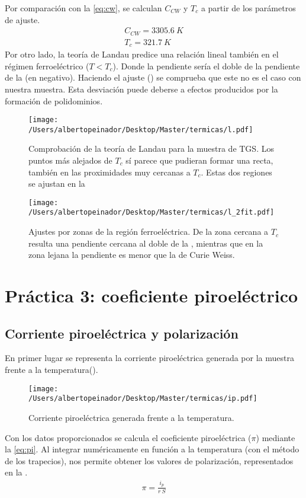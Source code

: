 \documentclass[a4paper, 12pt, spanish]{article}
\begin{document}
\begin{multicols}{2}
Por comparación con la \cref{eq:cw}, se calculan $C_{CW}$ y $T_c$ a partir de los parámetros de ajuste.\begin{eqnarray}
    C_{CW} = 3305.6\ K\\
    T_c = 321.7\ K
\end{eqnarray}
Por otro lado, la teoría de Landau predice una relación lineal también en el régimen ferroeléctrico ($T<T_c$). Donde la pendiente sería el doble de la pendiente de la  (en negativo). Haciendo el ajuste () se comprueba que este no es el caso con nuestra muestra. Esta desviación puede deberse a efectos producidos por la formación de polidominios.
\begin{figure}[H]
    \centering
    \texttt{[image: /Users/albertopeinador/Desktop/Master/termicas/l.pdf]}
    \caption{Comprobación de la teoría de Landau para la muestra de TGS. Los puntos más alejados de $T_c$ sí parece que pudieran formar una recta, también en las proximidades muy cercanas a $T_c$. Estas dos regiones se ajustan en la }\label{fig:l}
\end{figure}
\begin{figure}[H]
    \centering
    \texttt{[image: /Users/albertopeinador/Desktop/Master/termicas/l\_2fit.pdf]}
    \caption{Ajustes por zonas de la región ferroeléctrica. De la zona cercana a $T_c$ resulta una pendiente cercana al doble de la , mientras que en la zona lejana la pendiente es menor que la de Curie Weiss.}\label{fig:l_2}
\end{figure}

\section{Práctica 3: coeficiente piroeléctrico}
\subsection*{Corriente piroeléctrica y polarización}
En primer lugar se representa la corriente piroeléctrica generada por la muestra frente a la temperatura().
\begin{figure}[H]
    \centering
    \texttt{[image: /Users/albertopeinador/Desktop/Master/termicas/ip.pdf]}
    \caption{Corriente piroeléctrica generada frente a la temperatura.}\label{fig:ip}
\end{figure}
Con los datos proporcionados se calcula el coeficiente piroeléctrica ($\pi$) mediante la \cref{eq:pi}. Al integrar numéricamente en función a la temperatura (con el método de los trapecios), nos permite obtener los valores de polarización, representados en la .
\begin{eqnarray}
    \pi = \frac{i_p}{r\ S}\label{eq:pi}
\end{eqnarray}


\end{multicols}
\end{document}
